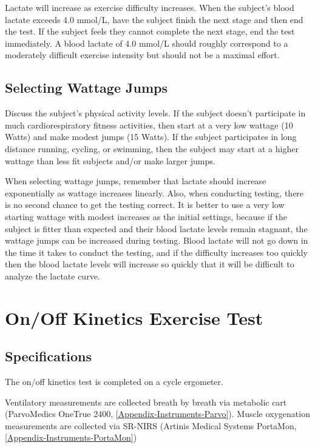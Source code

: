\documentclass[
]{book}
\begin{document}
Lactate will increase as exercise difficulty increases. When the subject's blood lactate exceeds 4.0 mmol/L, have the subject finish the next stage and then end the test. If the subject feels they cannot complete the next stage, end the test immediately. A blood lactate of 4.0 mmol/L should roughly correspond to a moderately difficult exercise intensity but should not be a maximal effort.

\hypertarget{ExerciseTesting-LT-Watts}{%
\subsection{Selecting Wattage Jumps}\label{ExerciseTesting-LT-Watts}}

Discuss the subject's physical activity levels. If the subject doesn't participate in much cardiorespiratory fitness activities, then start at a very low wattage (10 Watts) and make modest jumps (15 Watts). If the subject participates in long distance running, cycling, or swimming, then the subject may start at a higher wattage than less fit subjects and/or make larger jumps.

When selecting wattage jumps, remember that lactate should increase exponentially as wattage increases linearly. Also, when conducting testing, there is no second chance to get the testing correct. It is better to use a very low starting wattage with modest increases as the initial settings, because if the subject is fitter than expected and their blood lactate levels remain stagnant, the wattage jumps can be increased during testing. Blood lactate will not go down in the time it takes to conduct the testing, and if the difficulty increases too quickly then the blood lactate levels will increase so quickly that it will be difficult to analyze the lactate curve.

\hypertarget{ExerciseTesting-Onoff}{%
\section{On/Off Kinetics Exercise Test}\label{ExerciseTesting-Onoff}}

\hypertarget{ExerciseTesting-Onoff-Specs}{%
\subsection{Specifications}\label{ExerciseTesting-Onoff-Specs}}

The on/off kinetics test is completed on a cycle ergometer.

Ventilatory measurements are collected breath by breath via metabolic cart (ParvoMedics OneTrue 2400, \ref{Appendix-Instruments-Parvo}). Muscle oxygenation measurements are collected via SR-NIRS (Artinis Medical Systems PortaMon, \ref{Appendix-Instruments-PortaMon})
\end{document}
